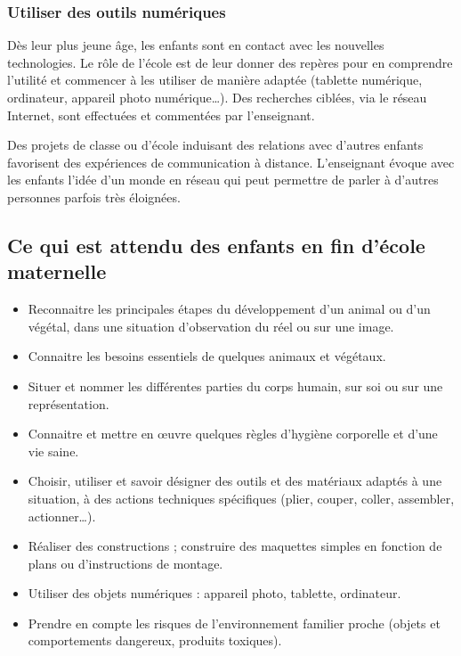 \subsubsection{Utiliser des outils numériques}
Dès leur plus jeune âge, les enfants sont en contact avec les nouvelles technologies. Le rôle de l’école est de leur donner des repères pour en comprendre l’utilité et commencer à les utiliser de manière adaptée (tablette numérique, ordinateur, appareil photo numérique\dots). Des recherches ciblées, via le réseau Internet, sont effectuées et commentées par l’enseignant. 

Des projets de classe ou d’école induisant des relations avec d’autres enfants favorisent des expériences de communication à distance. L’enseignant évoque avec les enfants l’idée d’un monde en réseau qui peut permettre de parler à d’autres personnes parfois très éloignées.

\subsection{Ce qui est attendu des enfants en fin d’école maternelle}
\begin{itemize}
\item Reconnaitre les principales étapes du développement d'un animal ou d'un végétal, dans une situation d’observation du réel ou sur une image.
\item Connaitre les besoins essentiels de quelques animaux et végétaux.
\item Situer et nommer les différentes parties du corps humain, sur soi ou sur une représentation.
\item Connaitre et mettre en œuvre quelques règles d'hygiène corporelle et d’une vie saine.
\item Choisir, utiliser et savoir désigner des outils et des matériaux adaptés à une situation, à des actions techniques spécifiques (plier, couper, coller, assembler, actionner\dots).
\item Réaliser des constructions ; construire des maquettes simples en fonction de plans ou d’instructions de montage. 
\item Utiliser des objets numériques : appareil photo, tablette, ordinateur.
\item Prendre en compte les risques de l'environnement familier proche (objets et comportements dangereux, produits toxiques).
\end{itemize}